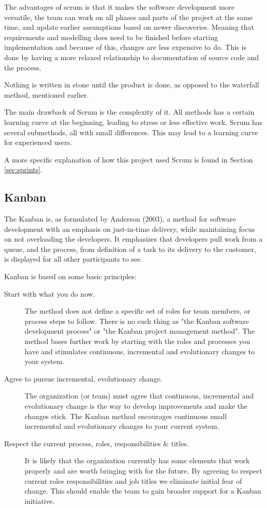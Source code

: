 The advantages of scrum is that it makes the software development more versatile, 
the team can work on all phases and parts of the project at the same time, and 
update earlier assumptions based on newer discoveries. Meaning that requirements and 
modelling does need to be finished before starting implementation and because of this, 
changes are less expensive to do. This is done by having a more relaxed relationship 
to documentation of source code and the process.

Nothing is written in stone until the product is done, as opposed to the waterfall 
method, mentioned earlier.

The main drawback of Scrum is the complexity of it. All methods has a certain learning 
curve at the beginning, leading to stress or less effective work. Scrum has several 
submethods, all with small differences. This may lead to a learning curve for 
experienced users.

A more specific explanation of how this project used Scrum is found in Section \ref{sec:sprints}.

\subsection{Kanban}
The Kanban is, as formulated by Anderson (2003\cite{Kanban}), a method for software development with an emphasis on just-in-time delivery, while maintaining focus on not overloading the developers. It emphasizes that developers pull work from a queue, and the process, from definition of a task to its delivery to the customer, is displayed for all other participants to see.

Kanban is based on some basic principles:
\begin{description}
	\item[Start with what you do now.] The method does not define a specific set of roles for team members, or process steps to follow. There is no such thing as "the Kanban software development process" or "the Kanban project management method". The method bases further work by starting with the roles and processes you have and stimulates continuous, incremental and evolutionary changes to your system.
	\item[Agree to pursue incremental, evolutionary change.] The organization (or team) must agree that continuous, incremental and evolutionary change is the way to develop improvements and make the changes stick. The Kanban method encourages continuous small incremental and evolutionary changes to your current system.
	\item[Respect the current process, roles, responsibilities \& titles.] It is likely that the organization currently has some elements that work properly and are worth bringing with for the future. By agreeing to respect current roles responsibilities and job titles we eliminate initial fear of change. This should enable the team to gain broader support for a Kanban initiative. 
\end{description}

